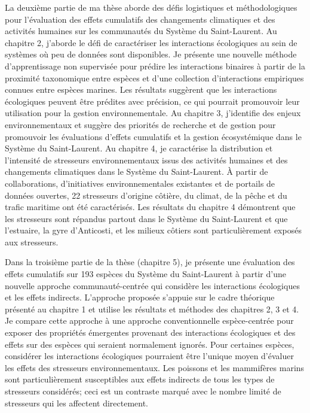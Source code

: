 La deuxième partie de ma thèse aborde des défis logistiques et
méthodologiques pour l'évaluation des effets cumulatifs des changements
climatiques et des activités humaines sur les communautés du Système du
Saint-Laurent. Au chapitre 2, j'aborde le défi de caractériser les
interactions écologiques au sein de systèmes où peu de données sont
disponibles. Je présente une nouvelle méthode d'apprentissage non
supervisée pour prédire les interactions binaires à partir de la
proximité taxonomique entre espèces et d'une collection d'interactions
empiriques connues entre espèces marines. Les résultats suggèrent que
les interactions écologiques peuvent être prédites avec précision, ce
qui pourrait promouvoir leur utilisation pour la gestion
environnementale. Au chapitre 3, j'identifie des enjeux environnementaux
et suggère des priorités de recherche et de gestion pour promouvoir les
évaluations d'effets cumulatifs et la gestion écosystémique dans le
Système du Saint-Laurent. Au chapitre 4, je caractérise la distribution
et l'intensité de stresseurs environnementaux issus des activités
humaines et des changements climatiques dans le Système du
Saint-Laurent. À partir de collaborations, d'initiatives
environnementales existantes et de portails de données ouvertes, 22
stresseurs d'origine côtière, du climat, de la pêche et du trafic
maritime ont été caractérisés. Les résultats du chapitre 4 démontrent
que les stresseurs sont répandus partout dans le Système du
Saint-Laurent et que l'estuaire, la gyre d'Anticosti, et les milieux
côtiers sont particulièrement exposés aux stresseurs.

Dans la troisième partie de la thèse (chapitre 5), je présente une
évaluation des effets cumulatifs sur 193 espèces du Système du
Saint-Laurent à partir d'une nouvelle approche communauté-centrée qui
considère les interactions écologiques et les effets indirects.
L'approche proposée s'appuie sur le cadre théorique présenté au chapitre
1 et utilise les résultats et méthodes des chapitres 2, 3 et 4. Je
compare cette approche à une approche conventionnelle espèce-centrée
pour exposer des propriétés émergentes provenant des interactions
écologiques et des effets sur des espèces qui seraient normalement
ignorés. Pour certaines espèces, considérer les interactions écologiques
pourraient être l'unique moyen d'évaluer les effets des stresseurs
environnementaux. Les poissons et les mammifères marins sont
particulièrement susceptibles aux effets indirects de tous les types de
stresseurs considérés; ceci est un contraste marqué avec le nombre
limité de stresseurs qui les affectent directement.

